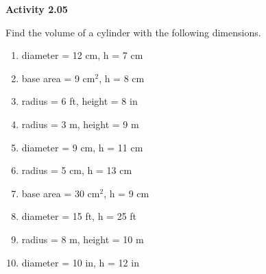 \vspace{1ex}
\noindent\textbf{Activity 2.05}

\vspace{0.2ex}

Find the volume of a cylinder with the following dimensions.

\begin{multicols}{2}
\begin{enumerate}[noitemsep, label = \color{blue}\arabic*. ]
    \item diameter = 12 cm, h = 7 cm
    \item base area = 9 cm\(^{2}\), h = 8 cm
    \item radius = 6 ft, height = 8 in
    \item radius = 3 m, height = 9 m
    \item diameter = 9 cm, h = 11 cm
    \item radius = 5 cm, h = 13 cm
    \item base area = 30 cm\(^{2}\), h = 9 cm
    \item diameter = 15 ft, h = 25 ft
    \item radius = 8 m, height = 10 m
    \item diameter = 10 in, h = 12 in
\end{enumerate}
\end{multicols}


